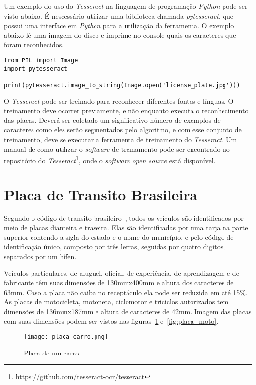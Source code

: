 Um exemplo do uso do \emph{Tesseract} na linguagem de programação \emph{Python} pode ser
visto abaixo. É nescessário utilizar uma biblioteca chamada \emph{pytesseract}, que possui
uma interface em \emph{Python} para a utilização da ferramenta. O exemplo abaixo lê uma
imagem do disco e imprime no console quais os caracteres que foram reconhecidos.

\begin{verbatim}
from PIL import Image
import pytesseract

print(pytesseract.image_to_string(Image.open('license_plate.jpg')))
\end{verbatim}

O \emph{Tesseract} pode ser treinado para reconhecer diferentes fontes e línguas. O
treinamento deve ocorrer previamente, e não enquanto executa o reconhecimento das placas.
Deverá ser coletado um significativo número de exemplos de caracteres como eles serão segmentados
pelo algoritmo, e com esse conjunto de treinamento, deve se executar a ferramenta de treinamento do
\emph{Tesseract}. Um manual de como utilizar o \emph{software} de treinamento pode ser encontrado
no repositório do \emph{Tesseract}\footnote{https://github.com/tesseract-ocr/tesseract}, onde o
\emph{software open source} está disponível.


\section{Placa de Transito Brasileira}
\label{sec:placabr}

Segundo o código de transito brasileiro~\cite{brasil1997lei}, todos os veículos
são identificados por meio de placas dianteira e traseira. Elas são
identificadas por uma tarja na parte superior contendo a sigla do estado e o
nome do município, e pelo código de identificação único, composto por três
letras, seguidas por quatro digitos, separados por um hífen.

Veículos particulares, de aluguel, oficial, de experiência, de aprendizagem e de
fabricante têm suas dimensões de 130mmx400mm e altura dos caracteres de 63mm.
Caso a placa não caiba no receptáculo ela pode ser reduzida em até 15\%. As
placas de motocicleta, motoneta, ciclomotor e triciclos autorizados tem
dimensões de 136mmx187mm e altura de caracteres de 42mm. Imagem das placas com
suas dimensões podem ser vistos nas figuras~\ref{fig:placa_carro}
e~\ref{fig:placa_moto}.

\begin{figure}[H]
		\centering
		\texttt{[image: placa\_carro.png]}
		\caption{Placa de um carro}
		\label{fig:placa_carro}
\end{figure}


